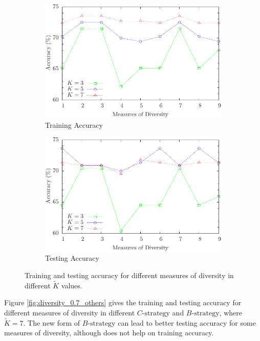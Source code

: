 \begin{figure} [t]
\centering
\begin{subfigure}{.49\textwidth}
  \centering
  \includegraphics[width=.95\linewidth]{../Figure/diversity_k_train}
  \caption{Training Accuracy}
  \label{fig:diversity_k_train}
\end{subfigure}%
\begin{subfigure}{.49\textwidth}
  \centering
  \includegraphics[width=.95\linewidth]{../Figure/diversity_k_test}
  \caption{Testing Accuracy}
  \label{fig:diversity_k_test}
\end{subfigure}
\caption{Training and testing accuracy for different measures of diversity in different $\tilde{K}$ values.}
\label{fig:diversity_k}
\end{figure}

Figure \ref{fig:diversity_0.7_others} gives the training and testing accuracy for different measures of diversity in different $C\text{-strategy}$ and $B\text{-strategy}$, where $\tilde{K}=7$. The new form of $B\text{-strategy}$ can lead to better testing accuracy for some measures of diversity, although does not help on training accuracy.

